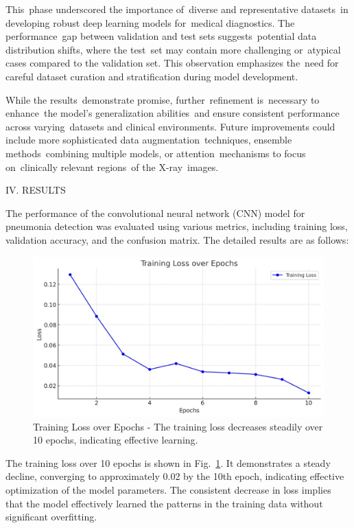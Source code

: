 \documentclass[
  twocolumn,
  10pt,
  a4paper,
  journal
]{IEEEtran}
\begin{document}
This~phase underscored the importance of~diverse and representative
datasets~in developing robust deep learning models for~medical
diagnostics. The performance~gap between validation and test sets
suggests~potential data distribution shifts, where the test~set may
contain more challenging or~atypical cases compared to the validation
set. This observation emphasizes the~need for careful dataset curation
and stratification during model development.

While the results~demonstrate promise, further~refinement is~necessary
to enhance~the model's generalization abilities~and
ensure consistent performance across varying~datasets and clinical
environments. Future improvements could include more sophisticated data
augmentation~techniques, ensemble methods~combining multiple models, or
attention~mechanisms to focus on~clinically relevant regions~of the
X-ray~images.

IV. RESULTS

The performance of the convolutional neural network (CNN) model for
pneumonia detection was evaluated using various metrics, including
training loss, validation accuracy, and the confusion matrix. The
detailed results are as follows:

\begin{figure}[!t]
\centering
\includegraphics[width=\columnwidth]{figures/figure4.jpeg}
\caption{Training Loss over Epochs - The training loss decreases steadily over 10 epochs, indicating effective learning.}
\label{fig:training_loss}
\end{figure}

The training loss over 10 epochs is shown in Fig.~\ref{fig:training_loss}. It demonstrates a steady decline, converging to approximately 0.02 by the 10th epoch, indicating effective optimization of the model parameters. The consistent decrease in loss implies that the model effectively learned the patterns in the training data without significant overfitting.
\end{document}

